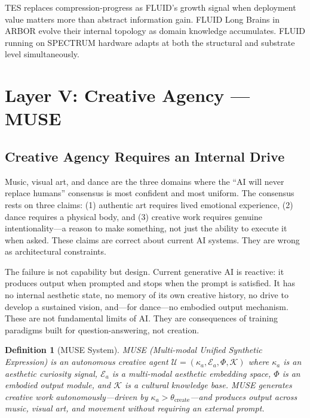 \documentclass[12pt]{article}
\newtheorem{definition}{Definition}
\begin{document}
TES replaces compression-progress as FLUID's growth signal when deployment value matters more than abstract information gain. FLUID Long Brains in ARBOR evolve their internal topology as domain knowledge accumulates. FLUID running on SPECTRUM hardware adapts at both the structural and substrate level simultaneously.

\section{Layer V: Creative Agency --- MUSE}
\label{sec:muse}

\subsection{Creative Agency Requires an Internal Drive}

Music, visual art, and dance are the three domains where the ``AI will never replace humans'' consensus is most confident and most uniform. The consensus rests on three claims: (1) authentic art requires lived emotional experience, (2) dance requires a physical body, and (3) creative work requires genuine intentionality---a reason to make something, not just the ability to execute it when asked. These claims are correct about current AI systems. They are wrong as architectural constraints.

The failure is not capability but design. Current generative AI is reactive: it produces output when prompted and stops when the prompt is satisfied. It has no internal aesthetic state, no memory of its own creative history, no drive to develop a sustained vision, and---for dance---no embodied output mechanism. These are not fundamental limits of AI. They are consequences of training paradigms built for question-answering, not creation.

\begin{definition}[MUSE System]
MUSE (Multi-modal Unified Synthetic Expression) is an autonomous creative agent $\mathcal{U} = (\kappa_a, \mathcal{E}_a, \Phi, \mathcal{K})$ where $\kappa_a$ is an aesthetic curiosity signal, $\mathcal{E}_a$ is a multi-modal aesthetic embedding space, $\Phi$ is an embodied output module, and $\mathcal{K}$ is a cultural knowledge base. MUSE generates creative work autonomously---driven by $\kappa_a > \theta_{\text{create}}$---and produces output across music, visual art, and movement without requiring an external prompt.
\end{definition}
\end{document}
